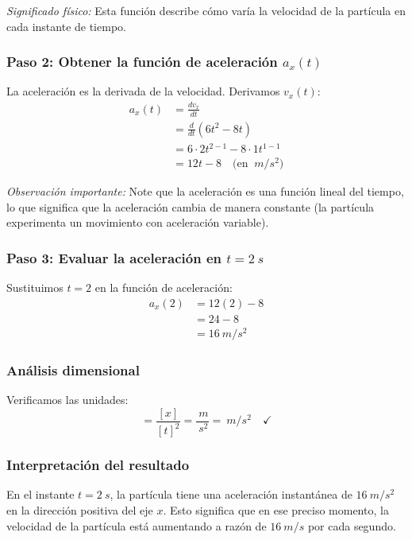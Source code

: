 \documentclass[12pt, a4paper]{article}
\begin{document}
\textit{Significado físico:} Esta función describe cómo varía la velocidad de la partícula en cada instante de tiempo.

\subsubsection*{Paso 2: Obtener la función de aceleración $a_x(t)$}
La aceleración es la derivada de la velocidad. Derivamos $v_x(t)$:
\begin{align*}
a_x(t) &= \frac{dv_x}{dt} \\
&= \frac{d}{dt}(6t^2 - 8t) \\
&= 6 \cdot 2t^{2-1} - 8 \cdot 1t^{1-1} \\
&= 12t - 8 \quad \text{(en } \SI{}{m/s^2}\text{)}
\end{align*}

\textit{Observación importante:} Note que la aceleración es una función lineal del tiempo, lo que significa que la aceleración cambia de manera constante (la partícula experimenta un movimiento con aceleración variable).

\subsubsection*{Paso 3: Evaluar la aceleración en $t = \SI{2}{s}$}
Sustituimos $t = 2$ en la función de aceleración:
\begin{align*}
a_x(2) &= 12(2) - 8 \\
&= 24 - 8 \\
&= \SI{16}{m/s^2}
\end{align*}

\subsubsection*{Análisis dimensional}
Verificamos las unidades:
\begin{equation*}
[a_x] = \frac{[x]}{[t]^2} = \frac{\SI{}{m}}{\SI{}{s^2}} = \SI{}{m/s^2} \quad \checkmark
\end{equation*}

\subsubsection*{Interpretación del resultado}
En el instante $t = \SI{2}{s}$, la partícula tiene una aceleración instantánea de $\SI{16}{m/s^2}$ en la dirección positiva del eje $x$. Esto significa que en ese preciso momento, la velocidad de la partícula está aumentando a razón de $\SI{16}{m/s}$ por cada segundo.
\end{document}
